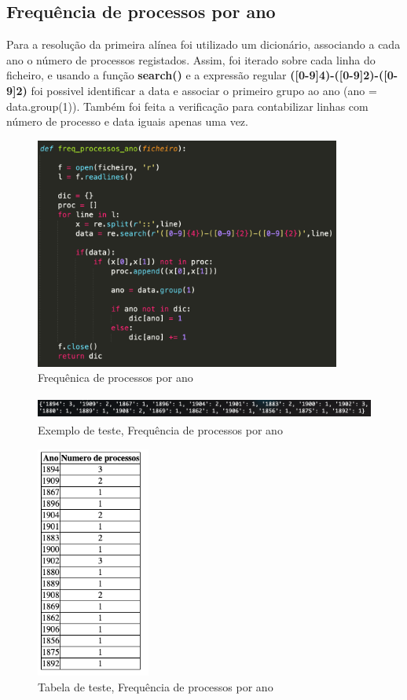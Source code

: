 \documentclass[a4paper, 12pt]{article}
\begin{document}
\subsection{Frequência de processos por ano}
Para a resolução da primeira alínea foi utilizado um dicionário, associando a cada ano o número de processos registados. Assim, foi iterado sobre cada linha do ficheiro, e usando a função \textbf{search()} e a expressão regular \textbf{([0-9]{4})-([0-9]{2})-([0-9]{2})} foi possivel identificar a data e associar o primeiro grupo ao ano (ano = data.group(1)). Também foi feita a verificação para contabilizar linhas com número de processo e data iguais apenas uma vez.
\begin{figure}[H]
    \centering
    \includegraphics[height=3in]{freq_processos_ano.png}
    \caption[Optional caption]{Frequênica de processos por ano}
    \label{fig:my_label}
\end{figure}
\begin{figure}[H]
    \centering
    \includegraphics[height=0.3in]{freq_ano-teste.png}
    \caption{Exemplo de teste, Frequência de processos por ano}
    \label{fig:my_label}
\end{figure}
\begin{figure}[H]
    \centering
    \includegraphics[height=3in]{freq_ano-tabela.png}
    \caption{Tabela de teste, Frequência de processos por ano}
    \label{fig:my_label}
\end{figure}
\newpage
\end{document}
